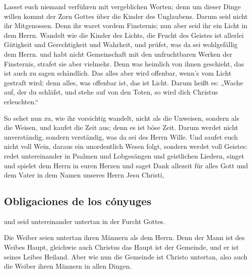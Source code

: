  Lasset euch niemand verführen mit vergeblichen Worten;
denn um dieser Dinge willen kommt der Zorn Gottes über die Kinder des
Unglaubens.  Darum seid nicht ihr Mitgenossen.
 Denn ihr waret vordem Finsternis; nun aber seid ihr ein
Licht in dem Herrn.  Wandelt wie die Kinder des Lichts,
die Frucht des Geistes ist allerlei Gütigkeit und Gerechtigkeit und
Wahrheit,  und prüfet, was da sei wohlgefällig dem Herrn.
 und habt nicht Gemeinschaft mit den unfruchtbaren Werken
der Finsternis, strafet sie aber vielmehr.  Denn was
heimlich von ihnen geschieht, das ist auch zu sagen schändlich.
 Das alles aber wird offenbar, wenn's vom Licht gestraft
wird; denn alles, was offenbar ist, das ist Licht.  Darum
heißt es: „Wache auf, der du schläfst, und stehe auf von den Toten, so
wird dich Christus erleuchten.``

 So sehet nun zu, wie ihr vorsichtig wandelt, nicht als
die Unweisen, sondern als die Weisen,  und kaufet die
Zeit aus; denn es ist böse Zeit.  Darum werdet nicht
unverständig, sondern verständig, was da sei des Herrn Wille.
 Und saufet euch nicht voll Wein, daraus ein unordentlich
Wesen folgt, sondern werdet voll Geistes:  redet
untereinander in Psalmen und Lobgesängen und geistlichen Liedern, singet
und spielet dem Herrn in euren Herzen  und saget Dank
allezeit für alles Gott und dem Vater in dem Namen unseres Herrn Jesu
Christi,

\hypertarget{obligaciones-de-los-cuxf3nyuges}{%
\subsection{Obligaciones de los
cónyuges}\label{obligaciones-de-los-cuxf3nyuges}}

 und seid untereinander untertan in der Furcht Gottes.

 Die Weiber seien untertan ihren Männern als dem Herrn.
 Denn der Mann ist des Weibes Haupt, gleichwie auch
Christus das Haupt ist der Gemeinde, und er ist seines Leibes Heiland.
 Aber wie nun die Gemeinde ist Christo untertan, also
auch die Weiber ihren Männern in allen Dingen.

